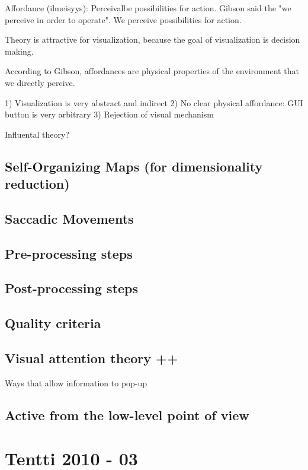 \documentclass[a4paper]{article}
\begin{document}
Affordance (ilmeisyys): Perceivalbe possibilities for action. Gibson said the "we perceive in order to operate". We perceive possibilities for action. 

Theory is attractive for visualization, because the goal of visualization is decision making. 

According to Gibson, affordances are physical properties of the environment that we directly percive.

1) Visualization is very abstract and indirect
2) No clear physical affordance: GUI button is very arbitrary
3) Rejection of visual mechanism

Influental theory?

\subsection{Self-Organizing Maps (for dimensionality reduction)}

\subsection{Saccadic Movements}

\subsection{Pre-processing steps}

\subsection{Post-processing steps}

\subsection{Quality criteria}

\subsection{Visual attention theory ++}

Ways that allow information to pop-up



\subsection{Active from the low-level point of view}

\section{Tentti 2010 - 03}
\end{document}
